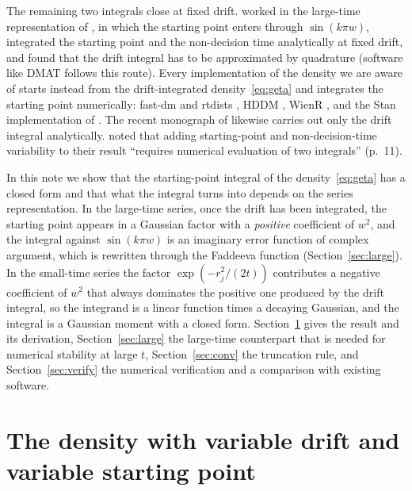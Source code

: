 \documentclass[final,5p,times,twocolumn,authoryear]{elsarticle}
\begin{document}
The remaining two integrals close at fixed drift. \citet[pp.~706--708]{Tuerlinckx2004} worked in the large-time representation of \citet{Ratcliff1978}, in which the starting point enters through $\sin(k\pi w)$, integrated the starting point and the non-decision time analytically at fixed drift, and found that the drift integral has to be approximated by quadrature (software like DMAT \citep{VandekerckhoveTuerlinckx2008} follows this route). Every implementation of the density we are aware of starts instead from the drift-integrated density~\eqref{eq:geta} and integrates the starting point numerically: fast-dm and rtdists \citep{VossVoss2007, Singmann2022}, HDDM \citep{Wiecki2013}, WienR \citep{HartmannKlauer2021, WienR}, and the Stan implementation of \citet{Henrich2024}. The recent monograph of \citet[Section~4.5]{SmithRatcliff2025} likewise carries out only the drift integral analytically. \citet{Blurton2017} noted that adding starting-point and non-decision-time variability to their result ``requires numerical evaluation of two integrals'' (p.~11).

In this note we show that the starting-point integral of the density~\eqref{eq:geta} has a closed form and that what the integral turns into depends on the series representation. In the large-time series, once the drift has been integrated, the starting point appears in a Gaussian factor with a \emph{positive} coefficient of $w^2$, and the integral against $\sin(k\pi w)$ is an imaginary error function of complex argument, which is rewritten through the Faddeeva function (Section~\ref{sec:large}). In the small-time series the factor $\exp(-r_j^2/(2t))$ contributes a negative coefficient of $w^2$ that always dominates the positive one produced by the drift integral, so the integrand is a linear function times a decaying Gaussian, and the integral is a Gaussian moment with a closed form. Section~\ref{sec:result} gives the result and its derivation, Section~\ref{sec:large} the large-time counterpart that is needed for numerical stability at large $t$, Section~\ref{sec:conv} the truncation rule, and Section~\ref{sec:verify} the numerical verification and a comparison with existing software.

\section{The density with variable drift and variable starting point}
\label{sec:result}
\end{document}
